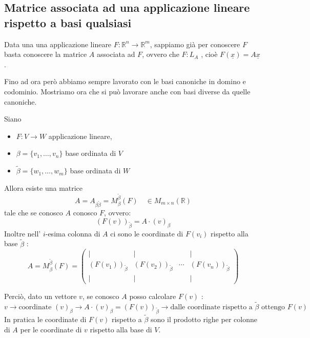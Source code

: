 \documentclass[
  a4paper,
]{article}
\providecommand{\tightlist}{%
  \setlength{\itemsep}{0pt}\setlength{\parskip}{0pt}}
\providecommand{\tightlist}{}
\begin{document}
\hypertarget{matrice-associata-ad-una-applicazione-lineare-rispetto-a-basi-qualsiasi}{%
\subsection{Matrice associata ad una applicazione lineare rispetto a
basi
qualsiasi}\label{matrice-associata-ad-una-applicazione-lineare-rispetto-a-basi-qualsiasi}}

Data una una applicazione lineare \(F : \mathbb{R}^n \to \mathbb{R}^m\),
sappiamo già per conoscere \(F\) basta conoscere la matrice \(A\)
associata ad \(F\), ovvero che \(F: L_A\) , cioè
\(F(\underline{x}) =A\underline{x}\) .

Fino ad ora però abbiamo sempre lavorato con le basi canoniche in domino
e codominio. Mostriamo ora che si può lavorare anche con basi diverse da
quelle canoniche.

\begin{propositionbox}
Siano

\begin{itemize}
\tightlist
\item
  \(F : V \to W\) applicazione lineare,
\item
  \(\beta = \{v_1, \dots, v_n\}\) base ordinata di \(V\)
\item
  \(\widetilde{\beta} = \{w_1, \dots, w_m\}\) base ordinata di \(W\)
\end{itemize}

Allora esiste una matrice \[
A = A_{\beta \widetilde{\beta}} = M^{\widetilde{\beta}}_{\beta}(F) \quad \in M_{m\times n}(\mathbb{R})
\] tale che se conosco \(A\) conosco \(F\), ovvero: \[
(F(v))_{\widetilde{\beta}} = A\cdot(v)_{\beta}
\] Inoltre nell' \(i\)-esima colonna di \(A\) ci sono le coordinate di
\(F(v_i)\) rispetto alla base \(\widetilde{\beta}\) : \[
A=M^{\widetilde{\beta}}_{\beta}(F)  
=  
\left(  
\begin{array}{cccc}  
\big| & \big| & & \big| \\  
(F(v_1))_{\widetilde{\beta}}  
&  
(F(v_2))_{\widetilde{\beta}}  
&  
\cdots  
&  
(F(v_n))_{\widetilde{\beta}}  
\\  
\big| & \big| & & \big|  
\end{array}  
\right)
\]
\end{propositionbox}

\begin{observationbox}
Perciò, dato un vettore \(v\), se conosco \(A\) posso calcolare \(F(v)\)
: \[
v \to \text{coordinate } (v)_{\beta} \to A \cdot (v)_\beta = (F(v))_{\widetilde{\beta}} \to \text{dalle coordinate rispetto a } \widetilde{\beta} \text{ ottengo } F(v)
\] In pratica le coordinate di \(F(v)\) rispetto a \(\widetilde{\beta}\)
sono il prodotto righe per colonne di \(A\) per le coordinate di \(v\)
rispetto alla base di \(V\).
\end{observationbox}
\end{document}
